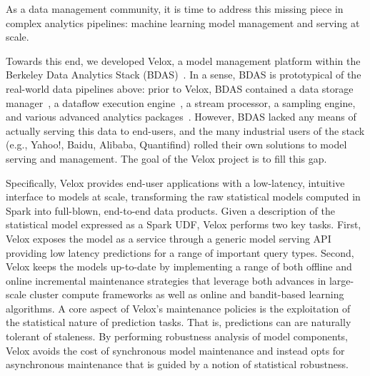 
As a data management community, it is time to address this missing piece in
complex analytics pipelines: machine learning model management and serving at scale.

Towards this end, we developed Velox, a model management platform
within the Berkeley Data Analytics Stack (BDAS)~\cite{velox-overview}. In a sense, BDAS is
prototypical of the real-world data pipelines above: prior to Velox,
BDAS contained a data storage manager~\cite{tachyon}, a dataflow
execution engine~\cite{spark}, a stream processor, a sampling engine,
and various advanced analytics packages~\cite{mli}. However, BDAS
lacked any means of actually serving this data to end-users, and the
many industrial users of the stack (e.g., Yahoo!, Baidu, Alibaba,
Quantifind) rolled their own solutions to model serving and
management. The goal of the Velox project is to fill this gap.

Specifically, Velox provides end-user applications with a low-latency,
intuitive interface to models at scale, transforming the raw
statistical models computed in Spark into full-blown, end-to-end data
products. Given a description of the statistical model expressed as a
Spark UDF, Velox performs two key tasks. First, Velox exposes the
model as a service through a generic model serving API providing low
latency predictions for a range of important query types. Second,
Velox keeps the models up-to-date by implementing a range of both
offline and online incremental maintenance strategies that leverage
both advances in large-scale cluster compute frameworks as well as
online and bandit-based learning algorithms.  A core aspect of Velox's
maintenance policies is the exploitation of the statistical nature of
prediction tasks. That is, predictions can are naturally tolerant of
staleness. By performing robustness analysis of model components,
Velox avoids the cost of synchronous model maintenance and instead
opts for asynchronous maintenance that is guided by a notion of
statistical robustness.
